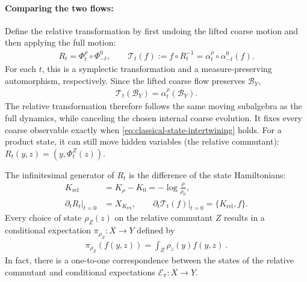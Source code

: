 \documentclass[a4paper,11pt]{article}
\theoremstyle{definition}
\newcommand{\mB}{\mathcal{B}}
\newcommand{\nn}{\nonumber}
\newcommand{\mE}{\mathcal{E}}
\begin{document}
\paragraph{Comparing the two flows:}
Define the relative transformation by first undoing the lifted coarse motion and then applying the full motion:
\begin{align}\label{eq:classical-relative-transformation}
    R_t=\Phi_t^\rho\circ\Phi_{-t}^0,
    \qquad
    \mathcal T_t(f):=f\circ R_t^{-1}
    =\alpha_t^\rho\circ\alpha_{-t}^0(f).
\end{align}
For each $t$, this is a symplectic transformation and a measure-preserving automorphism, respectively. Since the lifted coarse flow preserves $\mB_Y$,
\begin{align}\label{eq:classical-relative-algebra-flow}
    \mathcal T_t(\mB_Y)=\alpha_t^\rho(\mB_Y).
\end{align}
The relative transformation therefore follows the same moving subalgebra as the full dynamics, while canceling the chosen internal coarse evolution. It fixes every coarse observable exactly when \eqref{eq:classical-state-intertwining} holds. For a product state, it can still move hidden variables (the relative commutant): $R_t(y,z)=(y,\Phi_t^Z(z))$.

The infinitesimal generator of $R_t$ is the difference of the state Hamiltonians:
\begin{align}\label{eq:classical-relative-Hamiltonian}
    K_{\mathrm{rel}}&=K_\rho-K_0=-\log\frac{\rho}{\rho_0},\nn\\
    \left.\partial_tR_t\right|_{t=0}&=X_{K_{\mathrm{rel}}},\qquad
    \left.\partial_t\mathcal T_t(f)\right|_{t=0}=\{K_{\mathrm{rel}},f\}.
\end{align}
Every choice of state $\rho_Z(z)$ on the relative commutant $Z$ results in a conditional expectation $\pi_{\rho_Z}:X\to Y$ defined by 
\begin{align}
    \pi_{\rho_Z}(f(y,z))=\int_Z \rho_z(y)f(y,z)\ .
\end{align}
In fact, there is a one-to-one correspondence between the states of the relative commutant and conditional expectations $\mE_\pi:X\to Y$.


\end{document}
